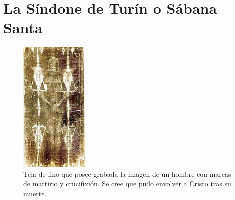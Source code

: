 \section{La Síndone de Turín o Sábana Santa} \label{app:sindone}

\begin{figure}[H]
    \centering
    \includegraphics[width=0.29\textwidth]{sindone.jpg}
    \caption{Tela de lino que posee grabada la imagen de un hombre con marcas de martirio y crucifixión. Se cree que pudo envolver a Cristo tras su muerte.\cite{RefWorks:72}} %
\end{figure}

